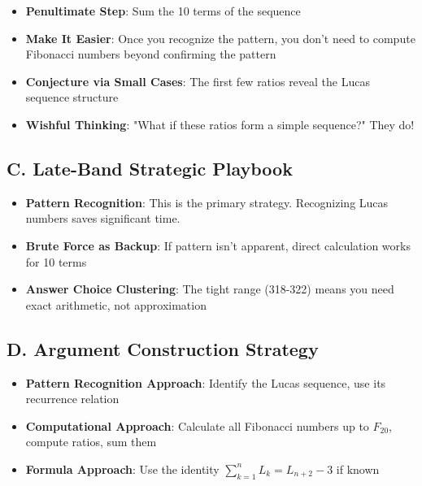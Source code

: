 \documentclass[12pt]{article}
\begin{document}
\begin{strategicbox}
\begin{itemize}[leftmargin=*]
    \item \textbf{Penultimate Step}: Sum the 10 terms of the sequence
    
    \item \textbf{Make It Easier}: Once you recognize the pattern, you don't need to compute Fibonacci numbers beyond confirming the pattern
    
    \item \textbf{Conjecture via Small Cases}: The first few ratios reveal the Lucas sequence structure
    
    \item \textbf{Wishful Thinking}: "What if these ratios form a simple sequence?" They do!
\end{itemize}

\subsection*{C. Late-Band Strategic Playbook}
\begin{itemize}[leftmargin=*]
    \item \textbf{Pattern Recognition}: This is the primary strategy. Recognizing Lucas numbers saves significant time.
    
    \item \textbf{Brute Force as Backup}: If pattern isn't apparent, direct calculation works for 10 terms
    
    \item \textbf{Answer Choice Clustering}: The tight range (318-322) means you need exact arithmetic, not approximation
\end{itemize}

\subsection*{D. Argument Construction Strategy}
\begin{itemize}[leftmargin=*]
    \item \textbf{Pattern Recognition Approach}: Identify the Lucas sequence, use its recurrence relation
    
    \item \textbf{Computational Approach}: Calculate all Fibonacci numbers up to $F_{20}$, compute ratios, sum them
    
    \item \textbf{Formula Approach}: Use the identity $\sum_{k=1}^{n} L_k = L_{n+2} - 3$ if known
\end{itemize}


\end{strategicbox}
\end{document}
